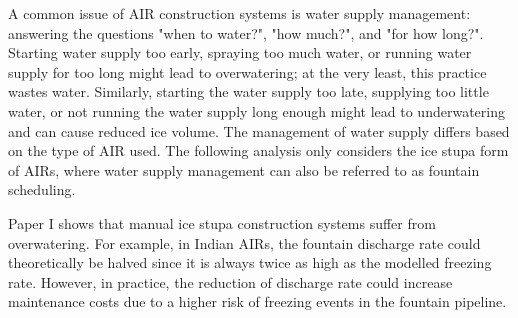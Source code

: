 A common issue of AIR construction systems is water supply management: answering the questions "when to
water?", "how much?", and "for how long?". Starting water supply too early, spraying too much water, or
running water supply for too long might lead to overwatering; at the very least, this practice wastes water.
Similarly, starting the water supply too late, supplying too little water, or not running the water supply long
enough might lead to underwatering and can cause reduced ice volume. The management of water supply
differs based on the type of AIR used. The following analysis only considers the ice stupa
form of AIRs, where water supply management can also be referred to as fountain scheduling.

%
Paper I shows that manual ice stupa construction systems suffer from overwatering. For example, in
Indian AIRs, the fountain discharge rate could theoretically be halved since it is always twice as high as the
modelled freezing rate. However, in practice, the reduction of discharge rate could increase maintenance costs
due to a higher risk of freezing events in the fountain pipeline.

